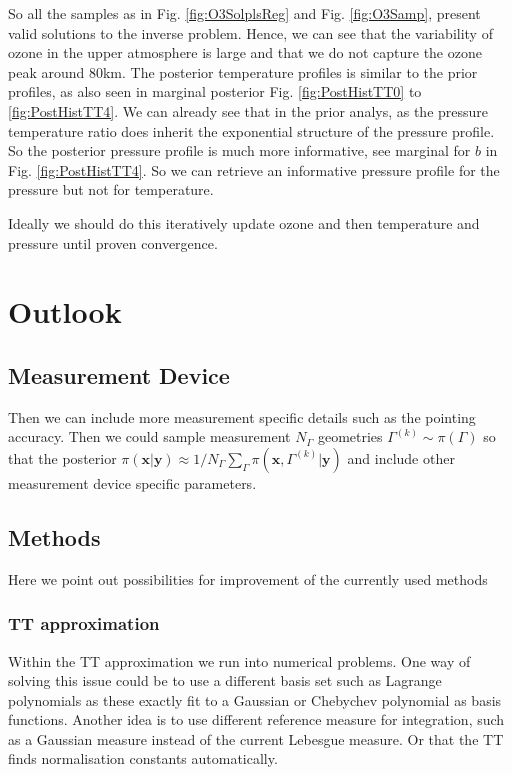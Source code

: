 So all the samples as in Fig. \ref{fig:O3SolplsReg} and Fig. \ref{fig:O3Samp}, present valid solutions to the inverse problem.
Hence, we can see that the variability of ozone in the upper atmosphere is large and that we do not capture the ozone peak around $80$km.
The posterior temperature profiles is similar to the prior profiles, as also seen in marginal posterior Fig. \ref{fig:PostHistTT0} to \ref{fig:PostHistTT4}.
We can already see that in the prior analys, as the pressure temperature ratio does inherit the exponential structure of the pressure profile.
So the posterior pressure profile is much more informative, see marginal for $b$ in Fig. \ref{fig:PostHistTT4}. 
So we can retrieve an informative pressure profile for the pressure but not for temperature.

Ideally we should do this iteratively update ozone and then temperature and pressure until proven convergence.
\chapter{Outlook}
\label{ch:SumOut}

\section{Measurement Device}
Then we can include more measurement specific details such as the pointing accuracy.
Then we could sample measurement $N_{\Gamma}$ geometries $\Gamma^{(k)}\sim \pi(\Gamma)$ so that the posterior $\pi(\bm{x}|\bm{y}) \approx 1/N_{\Gamma} \sum_{\Gamma} \pi(\bm{x}, \Gamma^{(k)}|\bm{y})$ and include other measurement device specific parameters.

\section{Methods}
Here we point out possibilities for improvement of the currently used methods
\subsection{TT approximation}
Within the TT approximation we run into numerical problems.
One way of solving this issue could be to use a different basis set such as Lagrange polynomials as these exactly fit to a Gaussian or Chebychev polynomial as basis functions.
Another idea is to use different reference measure for integration, such as a Gaussian measure instead of the current Lebesgue measure.
Or that the TT finds normalisation constants automatically.

